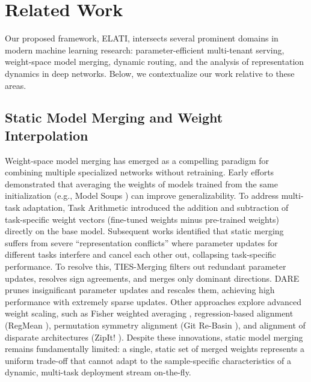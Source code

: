 \section{Related Work}
\label{sec:related_work}

Our proposed framework, ELATI, intersects several prominent domains in modern machine learning research: parameter-efficient multi-tenant serving, weight-space model merging, dynamic routing, and the analysis of representation dynamics in deep networks. Below, we contextualize our work relative to these areas.

\subsection{Static Model Merging and Weight Interpolation}
Weight-space model merging has emerged as a compelling paradigm for combining multiple specialized networks without retraining.
Early efforts demonstrated that averaging the weights of models trained from the same initialization (e.g., Model Soups \cite{wortsman22soups}) can improve generalizability.
To address multi-task adaptation, Task Arithmetic \cite{ilharco22arithmetic} introduced the addition and subtraction of task-specific weight vectors (fine-tuned weights minus pre-trained weights) directly on the base model.
Subsequent works identified that static merging suffers from severe ``representation conflicts'' where parameter updates for different tasks interfere and cancel each other out, collapsing task-specific performance.
To resolve this, TIES-Merging \cite{yadav23ties} filters out redundant parameter updates, resolves sign agreements, and merges only dominant directions.
DARE \cite{yu23dare} prunes insignificant parameter updates and rescales them, achieving high performance with extremely sparse updates.
Other approaches explore advanced weight scaling, such as Fisher weighted averaging \cite{matena22fisher}, regression-based alignment (RegMean \cite{jin22regmean}), permutation symmetry alignment (Git Re-Basin \cite{ainsworth22gitrebasin}), and alignment of disparate architectures (ZipIt! \cite{stoica23zipit}).
Despite these innovations, static model merging remains fundamentally limited: a single, static set of merged weights represents a uniform trade-off that cannot adapt to the sample-specific characteristics of a dynamic, multi-task deployment stream on-the-fly.

